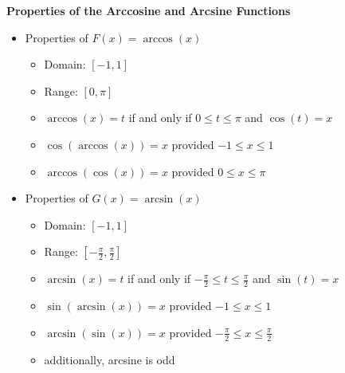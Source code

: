 \documentclass[12pt]{ximera}
\begin{document}
\begin{theorem} \label{arccosinesinefunctionprops}  \textbf{Properties of the Arccosine and Arcsine Functions}     

\begin{itemize}

\item  Properties of $F(x)= \arccos(x)$

\begin{itemize}

\item Domain:  $[-1,1]$

\item Range:  $[0,\pi]$

\item $\arccos(x) = t$ if and only if $0 \leq t \leq \pi$ and $\cos(t) = x$

\item $\cos(\arccos(x)) = x$ provided $-1 \leq x \leq 1$

\item $\arccos(\cos(x)) = x$ provided $0 \leq x \leq \pi$

\end{itemize}

\item  Properties of $G(x) = \arcsin(x)$

\begin{itemize}

\item Domain:  $[-1,1]$

\item Range:  $\left[ -\frac{\pi}{2}, \frac{\pi}{2}\right]$

\item $\arcsin(x) = t$ if and only if $-\frac{\pi}{2} \leq t \leq \frac{\pi}{2}$ and $\sin(t) = x$

\item $\sin(\arcsin(x)) = x$ provided $-1 \leq x \leq 1$

\item $\arcsin(\sin(x)) = x$ provided $-\frac{\pi}{2} \leq x \leq \frac{\pi}{2}$ 

\item additionally, arcsine is odd

\end{itemize}

\end{itemize}

\end{theorem}
\end{document}
